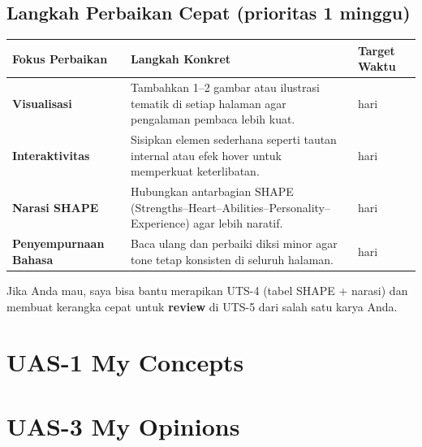 \documentclass[
  letterpaper,
  DIV=11,
  numbers=noendperiod]{scrreprt}
\begin{document}
\section{Langkah Perbaikan Cepat (prioritas 1
minggu)}\label{langkah-perbaikan-cepat-prioritas-1-minggu}

\begin{longtable}[]{@{}
  >{\raggedright\arraybackslash}p{}
  >{\raggedright\arraybackslash}p{}
  >{\raggedright\arraybackslash}p{}@{}}
\toprule\noalign{}
\begin{minipage}[b]{\linewidth}\raggedright
Fokus Perbaikan
\end{minipage} & \begin{minipage}[b]{\linewidth}\raggedright
Langkah Konkret
\end{minipage} & \begin{minipage}[b]{\linewidth}\raggedright
Target Waktu
\end{minipage} \\
\midrule\noalign{}
\endhead
\bottomrule\noalign{}
\endlastfoot
\textbf{Visualisasi} & Tambahkan 1--2 gambar atau ilustrasi tematik di
setiap halaman agar pengalaman pembaca lebih kuat. & 2 hari \\
\textbf{Interaktivitas} & Sisipkan elemen sederhana seperti tautan
internal atau efek hover untuk memperkuat keterlibatan. & 3 hari \\
\textbf{Narasi SHAPE} & Hubungkan antarbagian SHAPE
(Strengths--Heart--Abilities--Personality--Experience) agar lebih
naratif. & 2 hari \\
\textbf{Penyempurnaan Bahasa} & Baca ulang dan perbaiki diksi minor agar
tone tetap konsisten di seluruh halaman. & 1 hari \\
\end{longtable}

Jika Anda mau, saya bisa bantu merapikan UTS-4 (tabel SHAPE + narasi)
dan membuat kerangka cepat untuk \textbf{review} di UTS-5 dari salah
satu karya Anda.


\chapter{UAS-1 My Concepts}\label{uas-1-my-concepts}


\chapter{UAS-3 My Opinions}\label{uas-3-my-opinions}
\end{document}
